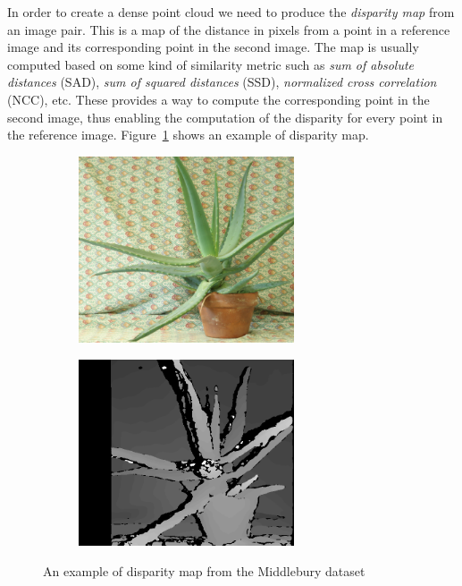 In order to create a dense point cloud we need to produce the 
\textit{disparity map} from an image pair. This is a map of the distance in 
pixels from a point in a reference image and its corresponding point in the 
second image. The map is usually computed based on some kind of similarity 
metric such as \textit{sum of absolute distances} (SAD), 
\textit{sum of squared distances} (SSD), 
\textit{normalized cross correlation} (NCC), etc. These provides a way to 
compute the corresponding point in the second image, thus enabling the 
computation of the disparity for every point in the reference image.
Figure~\ref{fig:disparity_example} shows an example of disparity map.
\begin{figure}[h]
	\centering
	\begin{subfigure}{0.4\textwidth}
		\centering
		\includegraphics[width=0.7\textwidth]{img/aloe_view1}
	\end{subfigure}
	\begin{subfigure}{0.4\textwidth}
		\centering
		\includegraphics[width=0.7\textwidth]{img/aloe_disparity}
	\end{subfigure}
	\caption{\label{fig:disparity_example}An example of disparity map from the
	Middlebury dataset \cite{hirschmuller2007evaluation}}
\end{figure}

